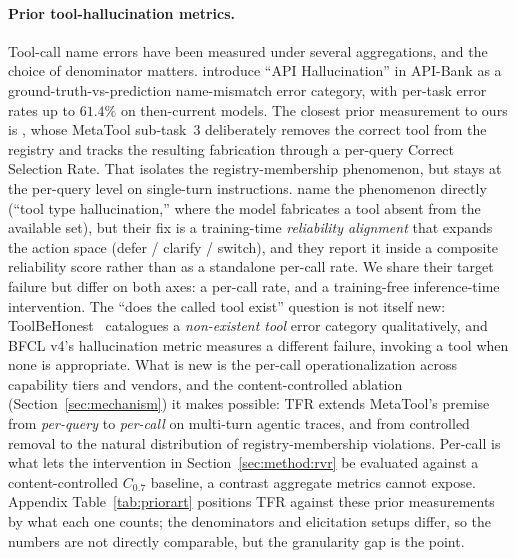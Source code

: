 \paragraph{Prior tool-hallucination metrics.}
Tool-call name errors have been measured under several aggregations,
and the choice of denominator matters. \citet{li2023apibank} introduce
``API Hallucination'' in API-Bank as a ground-truth-vs-prediction
name-mismatch error category, with per-task error rates up to $61.4\%$
on then-current models. The closest prior measurement to ours is
\citet{huang2024metatool}, whose MetaTool sub-task~3 deliberately
removes the correct tool from the registry and tracks the resulting
fabrication through a per-query Correct Selection Rate. That isolates the
registry-membership phenomenon, but stays at the per-query
level on single-turn instructions. \citet{cao2025reliability} name the
phenomenon directly (``tool type hallucination,'' where the model
fabricates a tool absent from the available set), but their fix is a
training-time \emph{reliability alignment} that expands the action space
(defer / clarify / switch), and they report it inside a composite
reliability score rather than as a standalone per-call rate. We share
their target failure but differ on both axes: a per-call rate, and a
training-free inference-time intervention. The ``does the called tool
exist'' question is not itself new: ToolBeHonest~\citep{toolbehonest2024}
catalogues a \emph{non-existent tool} error category qualitatively, and
BFCL v4's hallucination metric \citep{bfclv4_2025} measures a different
failure, invoking a tool when none is appropriate. What is new is the
per-call operationalization across capability tiers and vendors, and the
content-controlled ablation (Section~\ref{sec:mechanism}) it makes
possible: TFR extends MetaTool's premise from \emph{per-query} to
\emph{per-call} on multi-turn agentic traces, and from controlled
removal to the natural distribution of registry-membership violations.
Per-call is what lets the intervention in Section~\ref{sec:method:rvr}
be evaluated against a content-controlled $C_{0.7}$ baseline, a contrast
aggregate metrics cannot expose. Appendix Table~\ref{tab:priorart}
positions TFR against these prior measurements by what each one counts;
the denominators and elicitation setups differ, so the numbers are not
directly comparable, but the granularity gap is the point.


